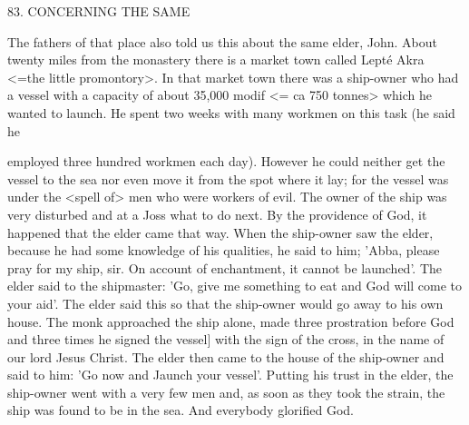 83. CONCERNING THE SAME

The fathers of that place also told us this about the same elder,
John. About twenty miles from the monastery there is a market
town called Lepté Akra <=the little promontory>. In that market
town there was a ship-owner who had a vessel with a capacity of
about 35,000 modif <= ca 750 tonnes> which he wanted to launch.
He spent two weeks with many workmen on this task (he said he

employed three hundred workmen each day). However he could
neither get the vessel to the sea nor even move it from the spot
where it lay; for the vessel was under the <spell of> men who were
workers of evil. The owner of the ship was very disturbed and at a
Joss what to do next. By the providence of God, it happened that
the elder came that way. When the ship-owner saw the elder,
because he had some knowledge of his qualities, he said to him;
'Abba, please pray for my ship, sir. On account of enchantment, it
cannot be launched'. The elder said to the shipmaster: 'Go, give me
something to eat and God will come to your aid'. The elder said
this so that the ship-owner would go away to his own house. The
monk approached the ship alone, made three prostration before
God and three times he signed the vessel] with the sign of the cross,
in the name of our lord Jesus Christ. The elder then came to the
house of the ship-owner and said to him: 'Go now and Jaunch your
vessel'. Putting his trust in the elder, the ship-owner went with a
very few men and, as soon as they took the strain, the ship was
found to be in the sea. And everybody glorified God.

